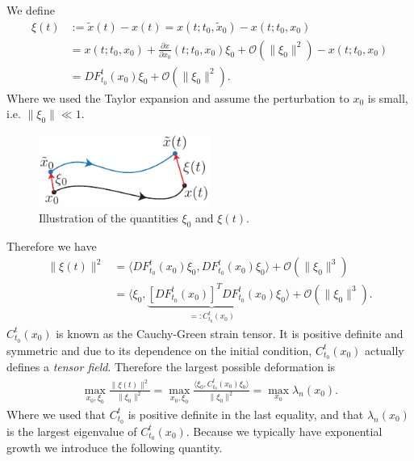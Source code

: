 \begin{ex}
	We define 
	\begin{subequations}	\begin{align}
		 {\xi}(t) &:= \tilde{ {x}}(t) -  {x}(t) =  {x}(t; t_0, \tilde{ {x}}_0) -  {x}(t; t_0,  {x}_0)\\
		       &=  {x}(t; t_0,  {x}_0) + \frac{\partial  {x}}{\partial  {x}_0}(t; t_0,  {x}_0) {\xi}_0 + \mathcal{O}( \| {\xi}_0 \|^2) -  {x}(t; t_0,  {x}_0) \\
		       &= DF_{t_0}^{t}( {x}_0) {\xi}_0 + \mathcal{O}( \| {\xi}_0 \|^2).
	\end{align}\end{subequations}
	Where we used the Taylor expansion and assume the perturbation to $ {x}_0$ is small, i.e. $ \| {\xi}_0 \| \ll 1$.
	\begin{figure}[h!]
		\centering
		\includegraphics[width=0.5\textwidth]{figures/ch1/8dispersion.pdf}
		\caption{Illustration of the quantities $\xi_0$ and $\xi(t)$.}
	\end{figure}
	Therefore we have
	\begin{subequations}	\begin{align}
		 \| {\xi}(t) \|^2 &= \langle DF_{t_0}^{t}( {x}_0)  {\xi}_0, DF_{t_0}^{t}( {x}_0) {\xi}_0 \rangle + \mathcal{O}( \| {\xi}_0 \|^3) \\
			   &= \langle  {\xi}_0, \underbrace{\left[ DF_{t_0}^{t}( {x}_0) \right]^T DF_{t_0}^{t}( {x}_0)}_{=: C_{t_0}^{t}( {x}_0)}  {\xi}_0 \rangle + \mathcal{O}( \| {\xi}_0 \|^3).
	\end{align}\end{subequations}
	$C_{t_0}^{t}( {x}_0)$ is known as the Cauchy-Green strain tensor. It is positive definite and symmetric and due to its dependence on the initial condition, $C_{t_0}^{t}(x_0)$ actually defines a \emph{tensor field}.
	Therefore the largest possible deformation is
	\begin{align}
		\max_{ {x}_0, {\xi}_0} \frac{ \| {\xi}(t) \|^2}{ \| {\xi}_0 \|^2} = \max_{ {x}_0,  {\xi}_0}\frac{\langle  {\xi}_0, C_{t_0}^{t}( {x}_0)  {\xi}_0 \rangle}{ \| {\xi}_0 \|^2} = \max_{ {x}_0} \lambda_{n}( {x}_0).
	\end{align}
	Where we used that $C_{t_0}^{t}$ is positive definite in the last equality, and that $\lambda_n( {x}_0)$ is the largest eigenvalue of $C_{t_0}^{t}( {x}_0)$. Because we typically have exponential growth we introduce the following quantity.	
\end{ex}
